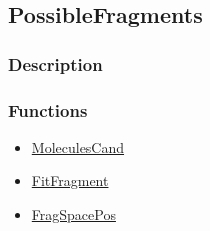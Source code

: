\subsection{PossibleFragments}\label{PossibleFragments}
\subsubsection{Description}


\subsubsection{Functions}
\begin{itemize}
\item \hyperref[MoleculesCand]{MoleculesCand}
\item \hyperref[FitFragment]{FitFragment}
\item \hyperref[FragSpacePos]{FragSpacePos}
\end{itemize}

